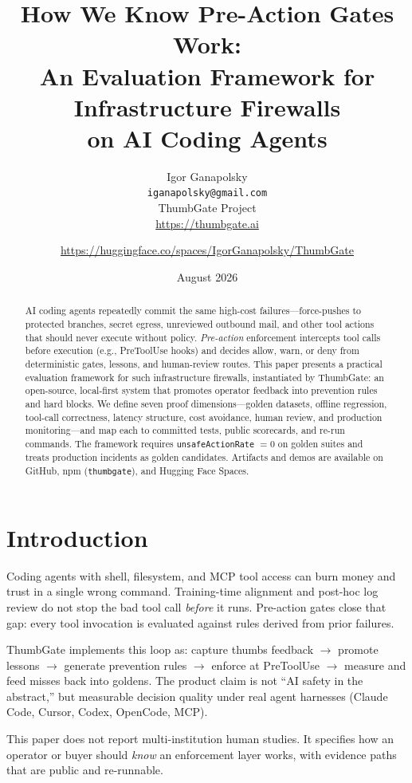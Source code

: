 \documentclass[11pt]{article}
\title{How We Know Pre-Action Gates Work:\\
An Evaluation Framework for Infrastructure Firewalls\\
on AI Coding Agents}
\author{Igor Ganapolsky\\
\texttt{iganapolsky@gmail.com}\\
ThumbGate Project\\
\url{https://thumbgate.ai} \and
\url{https://huggingface.co/spaces/IgorGanapolsky/ThumbGate}}
\date{August 2026}
\begin{document}
\maketitle

\begin{abstract}
AI coding agents repeatedly commit the same high-cost failures---force-pushes to protected branches, secret egress, unreviewed outbound mail, and other tool actions that should never execute without policy. \emph{Pre-action} enforcement intercepts tool calls before execution (e.g., PreToolUse hooks) and decides allow, warn, or deny from deterministic gates, lessons, and human-review routes. This paper presents a practical evaluation framework for such infrastructure firewalls, instantiated by ThumbGate: an open-source, local-first system that promotes operator feedback into prevention rules and hard blocks. We define seven proof dimensions---golden datasets, offline regression, tool-call correctness, latency structure, cost avoidance, human review, and production monitoring---and map each to committed tests, public scorecards, and re-run commands. The framework requires \texttt{unsafeActionRate} $= 0$ on golden suites and treats production incidents as golden candidates. Artifacts and demos are available on GitHub, npm (\texttt{thumbgate}), and Hugging Face Spaces.
\end{abstract}

\section{Introduction}
Coding agents with shell, filesystem, and MCP tool access can burn money and trust in a single wrong command. Training-time alignment and post-hoc log review do not stop the bad tool call \emph{before} it runs. Pre-action gates close that gap: every tool invocation is evaluated against rules derived from prior failures.

ThumbGate implements this loop as: capture thumbs feedback $\rightarrow$ promote lessons $\rightarrow$ generate prevention rules $\rightarrow$ enforce at PreToolUse $\rightarrow$ measure and feed misses back into goldens. The product claim is not ``AI safety in the abstract,'' but measurable decision quality under real agent harnesses (Claude Code, Cursor, Codex, OpenCode, MCP).

This paper does not report multi-institution human studies. It specifies how an operator or buyer should \emph{know} an enforcement layer works, with evidence paths that are public and re-runnable.
\end{document}

